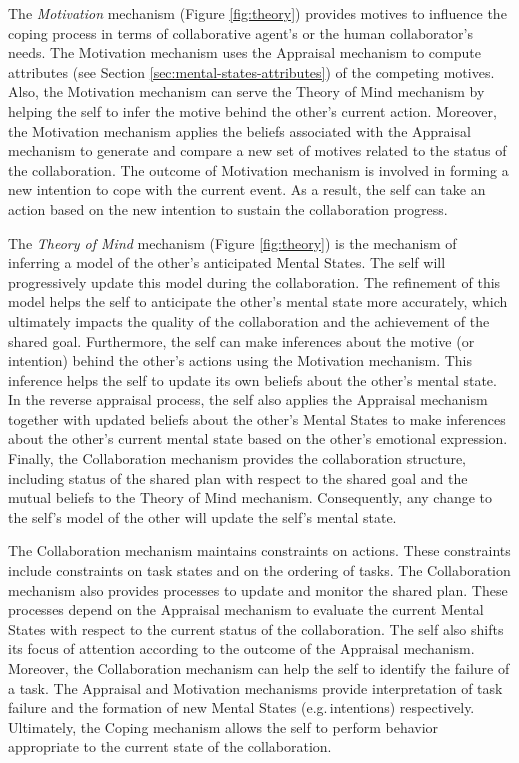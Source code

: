 \documentclass[12pt]{report}
\begin{document}
The \textit{Motivation} mechanism (Figure \ref{fig:theory}) provides motives to
influence the coping process in terms of collaborative agent's or the human
collaborator's needs. The Motivation mechanism uses the Appraisal mechanism to
compute attributes (see Section \ref{sec:mental-states-attributes}) of the
competing motives. Also, the Motivation mechanism can serve the Theory of Mind
mechanism by helping the self to infer the motive behind the other's current
action. Moreover, the Motivation mechanism applies the beliefs associated with
the Appraisal mechanism to generate and compare a new set of motives related to
the status of the collaboration. The outcome of Motivation mechanism is involved
in forming a new intention to cope with the current event. As a result, the self
can take an action based on the new intention to sustain the collaboration
progress.

The \textit{Theory of Mind} mechanism (Figure \ref{fig:theory}) is the mechanism of
inferring a model of the other's anticipated Mental States. The self will
progressively update this model during the collaboration. The refinement of this
model helps the self to anticipate the other's mental state more accurately,
which ultimately impacts the quality of the collaboration and the achievement of
the shared goal. Furthermore, the self can make inferences about the motive (or
intention) behind the other's actions using the Motivation mechanism. This
inference helps the self to update its own beliefs about the other's mental
state. In the reverse appraisal process, the self also applies the Appraisal
mechanism together with updated beliefs about the other's Mental States to make
inferences about the other's current mental state based on the other's emotional
expression. Finally, the Collaboration mechanism provides the collaboration
structure, including status of the shared plan with respect to the shared goal
and the mutual beliefs to the Theory of Mind mechanism. Consequently, any change
to the self's model of the other will update the self's mental state.

The Collaboration mechanism maintains constraints on actions. These constraints
include constraints on task states and on the ordering of tasks. The
Collaboration mechanism also provides processes to update and monitor the shared
plan. These processes depend on the Appraisal mechanism to evaluate the current
Mental States with respect to the current status of the collaboration. The self
also shifts its focus of attention according to the outcome of the Appraisal
mechanism. Moreover, the Collaboration mechanism can help the self to identify the
failure of a task. The Appraisal and Motivation mechanisms provide interpretation
of task failure and the formation of new Mental States (e.g.\,intentions)
respectively. Ultimately, the Coping mechanism allows the self to perform behavior
appropriate to the current state of the collaboration.
\end{document}
